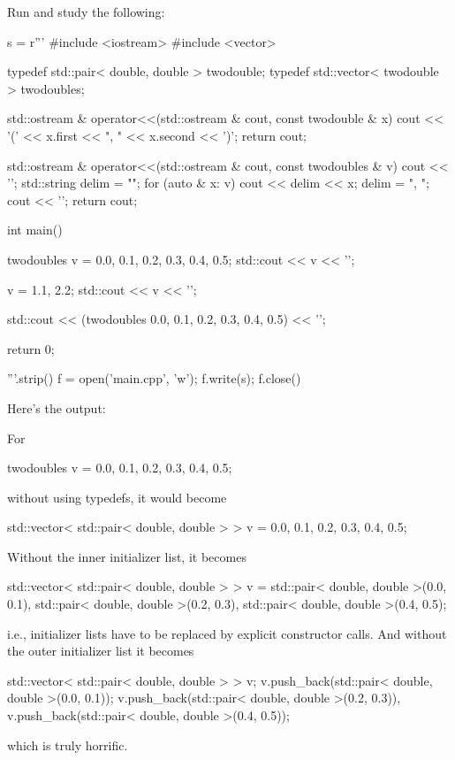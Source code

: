 Run and study the following:
\begin{python}
s = r'''
#include <iostream>
#include <vector>

typedef std::pair< double, double > twodouble;
typedef std::vector< twodouble > twodoubles;

std::ostream & operator<<(std::ostream & cout, const twodouble & x)
{
    cout << '(' << x.first << ", " << x.second << ')';
    return cout;
}

std::ostream & operator<<(std::ostream & cout, const twodoubles & v)
{
    cout << '{';
    std::string delim = "";
    for (auto & x: v)
    {
        cout << delim << x;
        delim = ", ";
    }
    cout << '}';
    return cout;
}

int main()
{
    twodoubles v = {{0.0, 0.1}, {0.2, 0.3}, {0.4, 0.5}};
    std::cout << v << '\n';

    v = {{1.1, 2.2}};
    std::cout << v << '\n';

    std::cout << (twodoubles {{0.0, 0.1}, {0.2, 0.3}, {0.4, 0.5}}) << '\n';
    
    return 0;
}'''.strip()
f = open('main.cpp', 'w'); f.write(s); f.close()
\end{python}
Here's the output:
For
\begin{console}[fontsize=\footnotesize,frame=single]
twodoubles v = {{0.0, 0.1}, {0.2, 0.3}, {0.4, 0.5}};
\end{console}
without using typedefs, it would become
\begin{console}[fontsize=\footnotesize,frame=single]
std::vector< std::pair< double, double > > v
    = {{0.0, 0.1}, {0.2, 0.3}, {0.4, 0.5}};
\end{console}
Without the inner initializer list, it becomes
\begin{console}[fontsize=\footnotesize,frame=single]
std::vector< std::pair< double, double > > v
    = {std::pair< double, double >(0.0, 0.1),
       std::pair< double, double >(0.2, 0.3),
       std::pair< double, double >(0.4, 0.5)};
\end{console}
i.e., initializer lists have to be replaced by explicit
constructor calls.
And without the outer initializer list it becomes
\begin{console}[fontsize=\footnotesize,frame=single]
std::vector< std::pair< double, double > > v;
v.push_back(std::pair< double, double >(0.0, 0.1));
v.push_back(std::pair< double, double >(0.2, 0.3)),
v.push_back(std::pair< double, double >(0.4, 0.5));
\end{console}
which is truly horrific.

